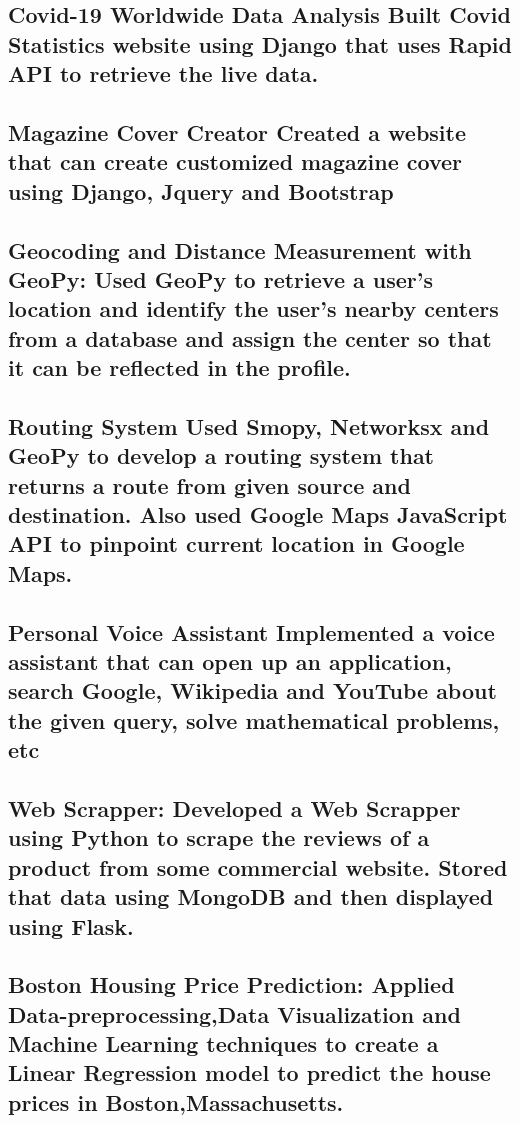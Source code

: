 \documentclass{article}
\begin{document}
\subsection{\textbf{Covid-19 Worldwide Data Analysis}
    \textmd{Built Covid Statistics website using Django that uses Rapid API to retrieve the live data.}}

\subsection{\textbf{Magazine Cover Creator}
    \textmd{Created a website that can create customized magazine cover using Django, Jquery and Bootstrap}}

\subsection{\textbf{Geocoding and Distance Measurement with GeoPy:}
    \textmd{Used GeoPy to retrieve a user's location and identify the user's nearby centers from a database and assign the center so that it can be reflected in the profile.}}

\subsection{\textbf{Routing System}
    \textmd{Used Smopy, Networksx and GeoPy to develop a routing system that returns a route from given source and destination. Also used Google Maps JavaScript API to pinpoint current location in Google Maps. }}

\subsection{\textbf{Personal Voice Assistant}
    \textmd{Implemented a voice assistant that can open up an application,
        search Google, Wikipedia and YouTube about the given query, solve mathematical problems, etc }}

\subsection{\textbf{Web Scrapper:}
    \textmd{Developed a Web Scrapper using Python to scrape the reviews of a product from some commercial website.
        Stored that data using MongoDB and then displayed using Flask.}}


\subsection{\textbf{Boston Housing Price Prediction:}
    \textmd{Applied Data-preprocessing,Data Visualization and Machine Learning techniques to create a
        Linear Regression model to predict the house prices in Boston,Massachusetts. } }
\end{document}
